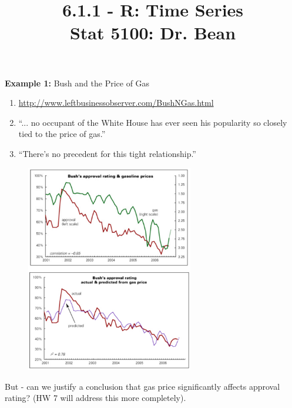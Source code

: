 \documentclass{article}\usepackage[]{graphicx}\usepackage[]{color}
\begin{document}
\title{%
6.1.1 - R: Time Series \\
\smallskip
\large Stat 5100: Dr. Bean
}
\date{}

\maketitle

\textbf{Example 1: } Bush and the Price of Gas

\begin{enumerate}
\item \href{http://www.leftbusinessobserver.com/BushNGas.html}{http://www.leftbusinessobserver.com/BushNGas.html}
\item ``... no occupant of the White House has ever seen his popularity so closely tied to the price of gas.''
\item ``There's no precedent for this tight relationship.''
\end{enumerate}

\begin{figure}[h]
\centering
\includegraphics[width = 0.65\textwidth]{../figures/module6/bush_gas_ratings.png}
\end{figure}

But - can we justify a conclusion that gas price significantly affects approval rating? (HW 7 will address this more completely). 

\newpage
\end{document}
